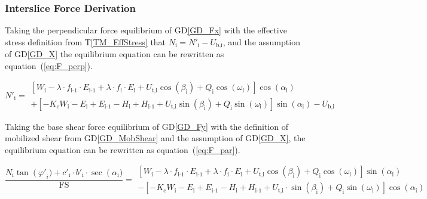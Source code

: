 \documentclass[12pt]{article}
\newcommand{\tref}[1]{T\ref{#1}}
\newcommand{\dref}[1]{GD\ref{#1}}
\begin{document}
\subsubsection*{Interslice Force Derivation} \label{sec:Ederivation}

Taking the perpendicular force equilibrium of \dref{GD_Fx} with the
effective stress definition from \tref{TM_EffStress} that
$N_{\text{i}}=N'_{\text{i}} - U_{\text{b,i}}$, and the assumption of
\dref{GD_X} the equilibrium equation can be rewritten as
equation~(\ref{eq:F_perp}).

\begin{equation}\label{eq:F_perp}   N'_{\text{i}}  = \begin{array}{l}    
    \left[ W_{\text{i}} - \lambda \cdot f_{\text{i-1}} \cdot
      E_{\text{i-1}} + \lambda \cdot f_{\text{i}} \cdot E_{\text{i}} +
      U_{\text{t,i}} {\cos\left(\beta_{\text{i}}\right)} +
      Q_{\text{i}} \cos\left(\omega_{\text{i}}\right)
      \right]\cos\left(\alpha_{\text{i}}\right) \\ + \left[
      -K_{\text{c}} W_{\text{i}} - E_{\text{i}} + E_{\text{i-1}} -
      H_{\text{i}} + H_{\text{i-1}} + U_{\text{t,i}}
      \sin\left(\beta_{\text{i}}\right) + Q_{\text{i}}
      \sin\left(\omega_{\text{i}}\right) \right]
    \sin\left(\alpha_{\text{i}}\right) - U_{\text{b,i}} \end{array}
\end{equation}

\noindent
Taking the base shear force equilibrium of \dref{GD_Fy} with the
definition of mobilized shear from \dref{GD_MobShear} and the assumption
of \dref{GD_X}, the equilibrium equation can be rewritten as
equation~(\ref{eq:F_par}).


\begin{equation}  \label{eq:F_par}
  \frac{
   N_{\text{i}} \tan\left(\varphi'\right._{i}) + c'_{\text{i}} \cdot b'_{\text{i}} \cdot \sec\left(\alpha_{\text{i}}\right.) 
  }
    { \text{FS} }
     = \begin{array}{l}
      \left[ W_{\text{i}}
       - \lambda \cdot
    
      f_{\text{i-1}} \cdot E_{\text{i-1}} + \lambda \cdot f_{\text{i}}
      \cdot E_{\text{i}} + U_{\text{t,i}}
      \cos\left(\beta_{\text{i}}\right) + Q_{\text{i}}
      \cos\left(\omega_{\text{i}}\right) \right]
    \sin\left(\alpha_{\text{i}}\right) \\ - \left[ -K_{\text{c}}
      W_{\text{i}} - E_{\text{i}} + E_{\text{i-1}} - H_{\text{i}} +
      H_{\text{i-1}} + U_{\text{t,i}} \cdot
      \sin\left(\beta_{\text{i}}\right) + Q_{\text{i}}
      \sin\left(\omega_{\text{i}}\right) \right]
    \cos\left(\alpha_{\text{i}}\right) \end{array}
\end{equation}
\end{document}
